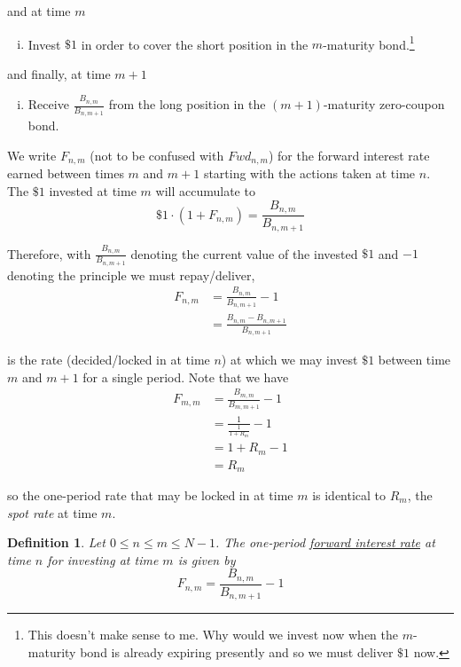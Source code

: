 \documentclass[12pt]{article}
\newtheorem{definition}{Definition}
\newlength\tindent
\renewcommand{\indent}{\hspace*{\tindent}}
\begin{document}
and at time $m$
\begin{enumerate}[(i)]
	\item Invest $\$1$ in order to cover the short position in the $m$-maturity bond.\footnote{This doesn't make sense to me. Why would we invest now when the $m$-maturity bond is already expiring presently and so we must deliver $\$1$ now.}
\end{enumerate}

and finally, at time $m + 1$
\begin{enumerate}[(i)]
	\item Receive $\frac{ B_{n, m} }{ B_{n, m + 1} }$ from the long position in the $(m + 1)$-maturity zero-coupon bond.
\end{enumerate}

\indent We write $F_{n,m}$ (not to be confused with $Fwd_{n,m}$) for the forward interest rate earned between times $m$ and $m + 1$ starting with the actions taken at time $n$. The $\$1$ invested at time $m$ will accumulate to
\begin{equation*}
	\$1\cdot(1 + F_{n,m}) = \frac{ B_{n,m} }{ B_{n, m + 1} } 
\end{equation*}

\indent Therefore, with $\frac{ B_{n,m} }{ B_{n, m + 1} }$ denoting the current value of the invested $\$1$ and $-1$ denoting the principle we must repay/deliver,
\begin{align*}
	F_{n,m} &= \frac{ B_{n,m} }{ B_{n, m + 1} } - 1 \\
	&= \frac{ B_{n,m} - B_{n, m + 1} }{ B_{n, m + 1} }
\end{align*}

is the rate (decided/locked in at time $n$) at which we may invest $\$1$ between time $m$ and $m + 1$ for a single period. Note that we have
\begin{align*}
	F_{m,m} &= \frac{ B_{m,m} }{ B_{m, m + 1} } - 1 \\
	&= \frac{1}{ \frac{1}{1 + R_m} } - 1 \\
	&= 1 + R_m - 1 \\
	&= R_m
\end{align*}

so the one-period rate that may be locked in at time $m$ is identical to $R_m$, the {\em spot rate} at time $m$. \\

\begin{definition} Let $0 \leq n \leq m \leq N - 1$. The one-period \underline{forward interest rate} at time $n$ for investing at time $m$ is given by
\begin{equation*}
	F_{n,m} = \frac{ B_{n,m} }{ B_{n, m + 1} } - 1
\end{equation*}
\end{definition}
\end{document}
